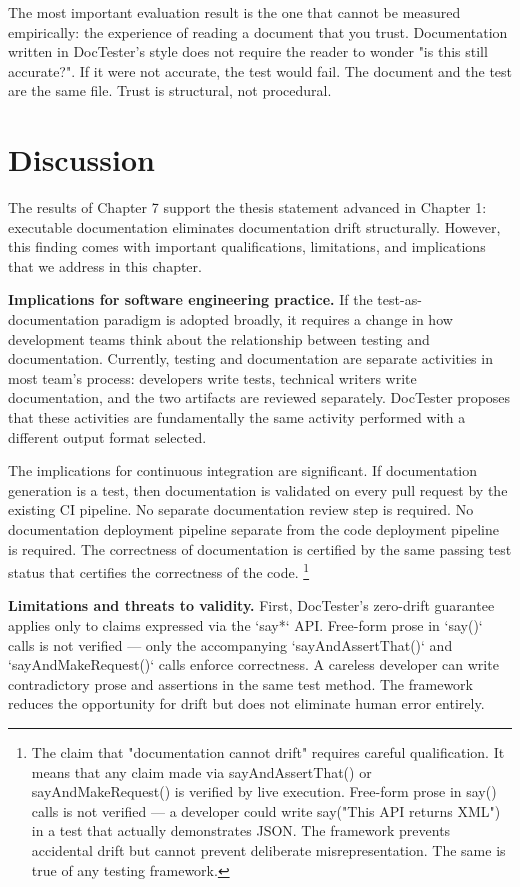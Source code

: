 \documentclass[11pt]{article}
\begin{document}
The most important evaluation result is the one that cannot be measured empirically: the experience of reading a document that you trust. Documentation written in DocTester's style does not require the reader to wonder "is this still accurate?". If it were not accurate, the test would fail. The document and the test are the same file. Trust is structural, not procedural.

\section{Discussion}

The results of Chapter 7 support the thesis statement advanced in Chapter 1: executable documentation eliminates documentation drift structurally. However, this finding comes with important qualifications, limitations, and implications that we address in this chapter.

\textbf{Implications for software engineering practice.} If the test-as-documentation paradigm is adopted broadly, it requires a change in how development teams think about the relationship between testing and documentation. Currently, testing and documentation are separate activities in most team's process: developers write tests, technical writers write documentation, and the two artifacts are reviewed separately. DocTester proposes that these activities are fundamentally the same activity performed with a different output format selected.

The implications for continuous integration are significant. If documentation generation is a test, then documentation is validated on every pull request by the existing CI pipeline. No separate documentation review step is required. No documentation deployment pipeline separate from the code deployment pipeline is required. The correctness of documentation is certified by the same passing test status that certifies the correctness of the code.
\footnote{The claim that "documentation cannot drift" requires careful qualification. It means that any claim made via sayAndAssertThat() or sayAndMakeRequest() is verified by live execution. Free-form prose in say() calls is not verified — a developer could write say("This API returns XML") in a test that actually demonstrates JSON. The framework prevents accidental drift but cannot prevent deliberate misrepresentation. The same is true of any testing framework.}

\textbf{Limitations and threats to validity.} First, DocTester's zero-drift guarantee applies only to claims expressed via the `say*` API. Free-form prose in `say()` calls is not verified — only the accompanying `sayAndAssertThat()` and `sayAndMakeRequest()` calls enforce correctness. A careless developer can write contradictory prose and assertions in the same test method. The framework reduces the opportunity for drift but does not eliminate human error entirely.
\end{document}
